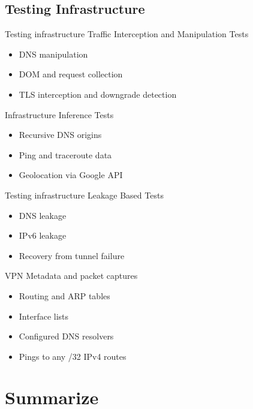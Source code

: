 \documentclass{beamer}
\begin{document}
\subsection{Testing Infrastructure}

\begin{frame}{Testing infrastructure}
  Traffic Interception and Manipulation Tests
  \begin{itemize}
    \item DNS manipulation
    \item DOM and request collection
    \item TLS interception and downgrade detection
  \end{itemize} \pause{}

  Infrastructure Inference Tests
  \begin{itemize}
    \item Recursive DNS origins
    \item Ping and traceroute data
    \item Geolocation via Google API
  \end{itemize}
\end{frame}

\begin{frame}{Testing infrastructure}
  Leakage Based Tests
  \begin{itemize}
    \item DNS leakage
    \item IPv6 leakage
    \item Recovery from tunnel failure
  \end{itemize} \pause{}

  VPN Metadata and packet captures
  \begin{itemize}
    \item Routing and ARP tables
    \item Interface lists
    \item Configured DNS resolvers
    \item Pings to any /32 IPv4 routes
  \end{itemize}

\end{frame}

\section{Summarize}
\end{document}

